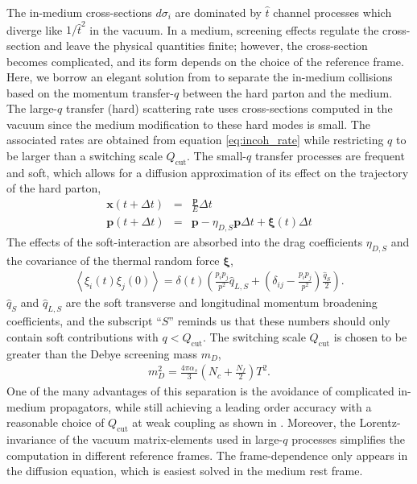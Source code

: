 \documentclass[aps, prc, reprint, amsmath, groupedaddress, nofootinbib]{revtex4-1}
\begin{document}
The in-medium cross-sections $d\sigma_i$ are dominated by $\hat{t}$ channel processes which diverge like $1/\hat{t}^2$ in the vacuum.
In a medium, screening effects regulate the cross-section and leave the physical quantities finite; however, the cross-section becomes complicated, and its form depends on the choice of the reference frame.
Here, we borrow an elegant solution from \cite{Ghiglieri:2015ala} to separate the in-medium collisions based on the momentum transfer-$q$ between the hard parton and the medium.
The large-$q$ transfer (hard) scattering rate uses cross-sections computed in the vacuum since the medium modification to these hard modes is small.
The associated rates are obtained from equation \ref{eq:incoh_rate} while restricting $q$ to be larger than a switching scale $Q_{\textrm{cut}}$.
The small-$q$ transfer processes are frequent and soft, which allows for a diffusion approximation of its effect on the trajectory of the hard parton,
\begin{eqnarray}
\mathbf{x}(t+\Delta t) &=& \frac{\mathbf{p}}{E}\Delta t\\
\mathbf{p}(t+\Delta t) &=& \mathbf{p} - \eta_{D,S} \mathbf{p} \Delta t + \mathbf{\xi}(t) \Delta t
\end{eqnarray}
The effects of the soft-interaction are absorbed into the drag coefficients $\eta_{D,S}$ and the covariance of the thermal random force $\mathbf{\xi}$,
\begin{eqnarray}
\left\langle\xi_i(t)\xi_j(0)\right\rangle = \delta(t) \left(
\frac{p_i p_j}{p^2}\hat{q}_{L,S} + \left(
\delta_{ij}-\frac{p_i p_j}{p^2}
\right)\frac{\hat{q}_S}{2} 
\right).
\end{eqnarray}
$\hat{q}_S$ and $\hat{q}_{L,S}$ are the soft transverse and longitudinal momentum broadening coefficients, and the subscript ``$S$'' reminds us that these numbers should only contain soft contributions with $q<Q_{\textrm{cut}}$.
The switching scale $Q_{\textrm{cut}}$ is chosen to be greater than the Debye screening mass $m_D$,
\begin{eqnarray}
m_D^2 = \frac{4\pi \alpha_s}{3}\left(N_c+\frac{N_f}{2}\right) T^2.
\end{eqnarray}
One of the many advantages of this separation is the avoidance of complicated in-medium propagators, while still achieving a leading order accuracy with a reasonable choice of $Q_{\textrm{cut}}$ at weak coupling as shown in \cite{Ghiglieri:2015ala}.
Moreover, the Lorentz-invariance of the vacuum matrix-elements used in large-$q$ processes simplifies the computation in different reference frames. The frame-dependence only appears in the diffusion equation, which is easiest solved in the medium rest frame.
\end{document}
